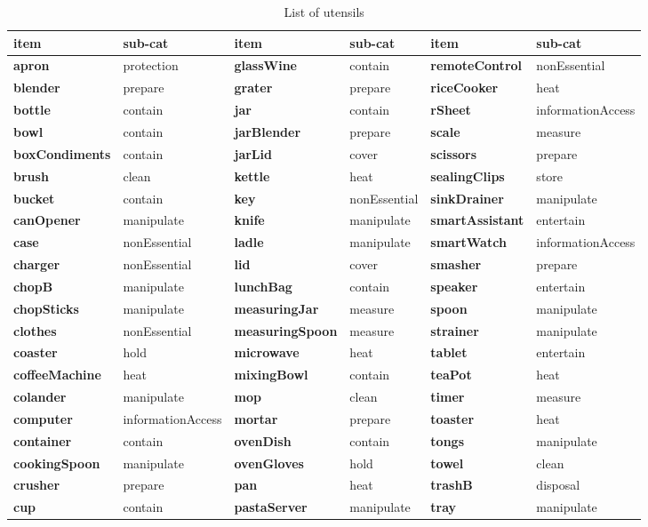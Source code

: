 \documentclass[]{article}
\begin{document}
\begin{table}

\caption{\label{tab:unnamed-chunk-6}List of utensils}
\centering
\begin{tabular}[t]{>{\bfseries}l|l|>{\bfseries}l|l|>{\bfseries}l|l}
\hline
item & sub-cat & item & sub-cat & item & sub-cat\\
\hline
apron & protection & glassWine & contain & remoteControl & nonEssential\\
\hline
blender & prepare & grater & prepare & riceCooker & heat\\
\hline
bottle & contain & jar & contain & rSheet & informationAccess\\
\hline
bowl & contain & jarBlender & prepare & scale & measure\\
\hline
boxCondiments & contain & jarLid & cover & scissors & prepare\\
\hline
brush & clean & kettle & heat & sealingClips & store\\
\hline
bucket & contain & key & nonEssential & sinkDrainer & manipulate\\
\hline
canOpener & manipulate & knife & manipulate & smartAssistant & entertain\\
\hline
case & nonEssential & ladle & manipulate & smartWatch & informationAccess\\
\hline
charger & nonEssential & lid & cover & smasher & prepare\\
\hline
chopB & manipulate & lunchBag & contain & speaker & entertain\\
\hline
chopSticks & manipulate & measuringJar & measure & spoon & manipulate\\
\hline
clothes & nonEssential & measuringSpoon & measure & strainer & manipulate\\
\hline
coaster & hold & microwave & heat & tablet & entertain\\
\hline
coffeeMachine & heat & mixingBowl & contain & teaPot & heat\\
\hline
colander & manipulate & mop & clean & timer & measure\\
\hline
computer & informationAccess & mortar & prepare & toaster & heat\\
\hline
container & contain & ovenDish & contain & tongs & manipulate\\
\hline
cookingSpoon & manipulate & ovenGloves & hold & towel & clean\\
\hline
crusher & prepare & pan & heat & trashB & disposal\\
\hline
cup & contain & pastaServer & manipulate & tray & manipulate\\

\end{tabular}
\end{table}
\end{document}
